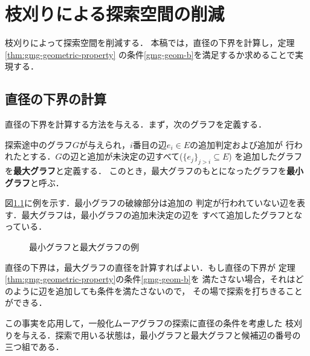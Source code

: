 
\chapter{枝刈りによる探索空間の削減}
\label{chap:reduce-by-prune}
枝刈りによって探索空間を削減する．
本稿では，直径の下界を計算し，定理\ref{thm:gmg-geometric-property}
の条件\ref{gmg-geom-b}を満足するか求めることで実現する．

\section{直径の下界の計算}
\label{sect:diameter-lower-bound}
直径の下界を計算する方法を与える．まず，次のグラフを定義する．
\begin{definition}
  探索途中のグラフ$G$が与えられ，$i$番目の辺$e_i\in E$の追加判定および追加が
  行われたとする．$G$の辺と追加が未決定の辺すべて($\{e_j\}_{j>i}\subseteq E$)
  を追加したグラフを\textbf{最大グラフ}と定義する．
  このとき，最大グラフのもとになったグラフを\textbf{最小グラフ}と呼ぶ．
\end{definition}
\begin{example}
  図\ref{fig:min-max-graph}に例を示す．最小グラフの破線部分は追加の
  判定が行われていない辺を表す．最大グラフは，最小グラフの追加未決定の辺を
  すべて追加したグラフとなっている．
\end{example}
\begin{figure}
  \centering
  \hfill
  \caption{最小グラフと最大グラフの例}
  \label{fig:min-max-graph}
\end{figure}

直径の下界は，最大グラフの直径を計算すればよい．もし直径の下界が
定理\ref{thm:gmg-geometric-property}の条件\ref{gmg-geom-b}を
満たさない場合，それはどのように辺を追加しても条件を満たさないので，
その場で探索を打ちきることができる．

この事実を応用して，一般化ムーアグラフの探索に直径の条件を考慮した
枝刈りを与える．探索で用いる状態は，最小グラフと最大グラフと候補辺の番号の
三つ組である．


